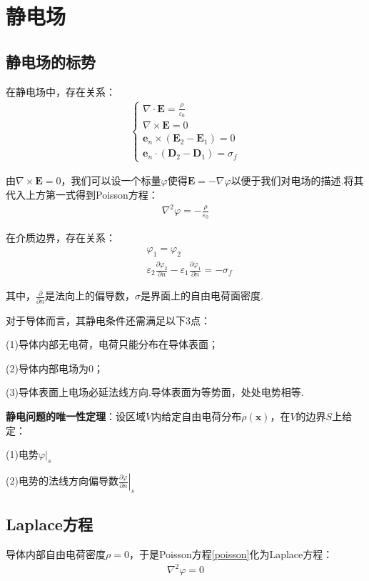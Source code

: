 \documentclass[main.tex]{subfiles}
\begin{document}
\chapter{静电场}
\section{静电场的标势}
在静电场中，存在关系：
\begin{align}
    \left\{\begin{array}{l}
    \nabla \cdot \boldsymbol{E} = \frac{\rho}{\varepsilon _0}\\
    \nabla \times \boldsymbol{E} = 0\\
    \boldsymbol{e}_n \times (\boldsymbol{E}_2 - \boldsymbol{E}_1) = 0\\
    \boldsymbol{e}_n \cdot (\boldsymbol{D}_2 - \boldsymbol{D}_1) = \sigma _f
    \end{array}\right.
\end{align}

由$\nabla \times \boldsymbol{E} = 0$，我们可以设一个标量$\varphi$使得$\boldsymbol{E} = -\nabla \varphi$以便于我们对电场的描述.将其代入上方第一式得到Poisson方程：
\begin{align}
    \label{poisson}\nabla ^2 \varphi = - \frac{\rho}{\varepsilon _0}
\end{align}

在介质边界，存在关系：
\begin{align}
    &\varphi _1 = \varphi _2\\
    &\varepsilon _2\frac{\partial \varphi_2}{\partial n} - \varepsilon _1\frac{\partial \varphi_1}{\partial n} = -\sigma _f
\end{align}

其中，$\frac{\partial }{\partial n}$是法向上的偏导数，$\sigma$是界面上的自由电荷面密度.

对于导体而言，其静电条件还需满足以下3点：

(1)导体内部无电荷，电荷只能分布在导体表面；

(2)导体内部电场为0；

(3)导体表面上电场必延法线方向.导体表面为等势面，处处电势相等.

\textbf{静电问题的唯一性定理}：设区域$V$内给定自由电荷分布$\rho(\boldsymbol{x})$，在$V$的边界$S$上给定：

(1)电势$\varphi|_s$

(2)电势的法线方向偏导数$\left. \frac{\partial \varphi}{\partial n}\right|_s$

\section{Laplace方程}
导体内部自由电荷密度$\rho = 0$，于是Poisson方程\ref{poisson}化为Laplace方程：
\begin{align}
    \label{laplace}\nabla ^2 \varphi = 0
\end{align}
\end{document}
